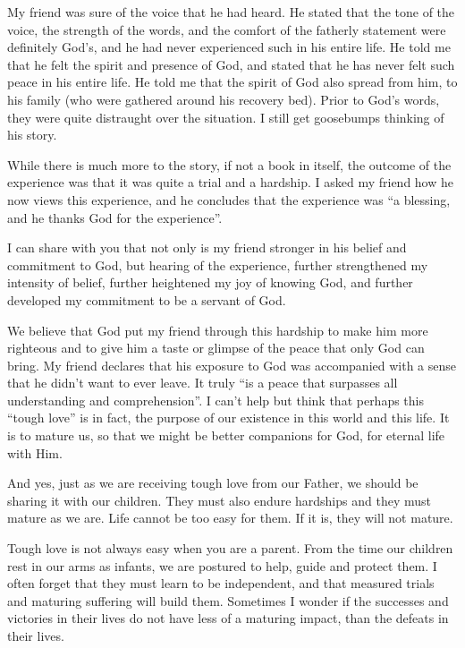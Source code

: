 \documentclass[12pt]{memoir}
\begin{document}
My friend was sure of the voice that he had heard. He stated that
the tone of the voice, the strength of the words, and the comfort
of the fatherly statement were definitely God's, and he had never
experienced such in his entire life. He told me that he felt the spirit
and presence of God, and stated that he has never felt such peace
in his entire life. He told me that the spirit of God also spread
from him, to his family (who were gathered around his recovery bed).
Prior to God's words, they were quite distraught over the situation.
I still get goosebumps thinking of his story.

While there is much more to the story, if not a book in itself, the
outcome of the experience was that it was quite a trial and a hardship.
I asked my friend how he now views this experience, and he concludes
that the experience was ``a blessing, and he thanks God for the experience''.

I can share with you that not only is my friend stronger in his belief
and commitment to God, but hearing of the experience, further strengthened
my intensity of belief, further heightened my joy of knowing God,
and further developed my commitment to be a servant of God.

We believe that God put my friend through this hardship to make him
more righteous and to give him a taste or glimpse of the peace that
only God can bring. My friend declares that his exposure to God was
accompanied with a sense that he didn't want to ever leave. It truly
``is a peace that surpasses all understanding and comprehension''.
I can't help but think that perhaps this ``tough love'' is in fact,
the purpose of our existence in this world and this life. It is to
mature us, so that we might be better companions for God, for eternal
life with Him.

And yes, just as we are receiving tough love from our Father, we should be sharing it with our children.
They must also endure hardships and they must mature as we are.
Life cannot be too easy for them. If it is, they will not mature.

Tough love is not always easy when you are a parent.
From the time our children rest in our arms as infants, we are postured to help, guide and protect them.
I often forget that they must learn to be independent, and that measured trials and maturing suffering will build them.
Sometimes I wonder if the successes and victories in their lives do not have less of a maturing impact, than the defeats in their lives.
\end{document}
